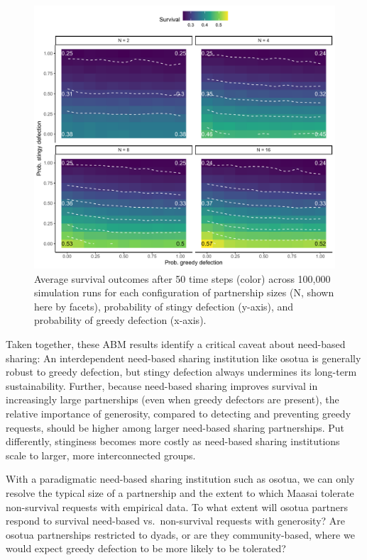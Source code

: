 \documentclass[
]{article}
\begin{document}
\begin{figure}
\centering
\includegraphics{needBasedSharing-paper_files/figure-latex/abmplot1-1.pdf}
\caption{\label{fig:abmplot1}Average survival outcomes after 50 time steps (color) across 100,000 simulation runs for each configuration of partnership sizes (N, shown here by facets), probability of stingy defection (y-axis), and probability of greedy defection (x-axis).}
\end{figure}

Taken together, these ABM results identify a critical caveat about need-based sharing: An interdependent need-based sharing institution like osotua is generally robust to greedy defection, but stingy defection always undermines its long-term sustainability. Further, because need-based sharing improves survival in increasingly large partnerships (even when greedy defectors are present), the relative importance of generosity, compared to detecting and preventing greedy requests, should be higher among larger need-based sharing partnerships. Put differently, stinginess becomes more costly as need-based sharing institutions scale to larger, more interconnected groups.

With a paradigmatic need-based sharing institution such as osotua, we can only resolve the typical size of a partnership and the extent to which Maasai tolerate non-survival requests with empirical data. To what extent will osotua partners respond to survival need-based vs.~non-survival requests with generosity? Are osotua partnerships restricted to dyads, or are they community-based, where we would expect greedy defection to be more likely to be tolerated?
\end{document}
